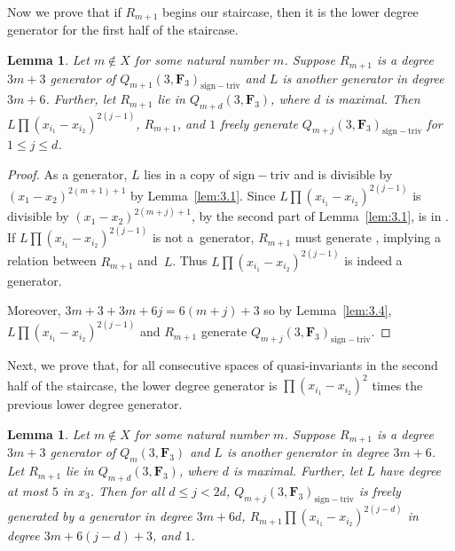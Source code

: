 \documentclass[pdftex]{sigma}
\newtheorem{Lemma}[Theorem]{Lemma}
\theoremstyle{definition}
\numberwithin{equation}{section}
\newcommand{\siv}{\mathrm{sign-triv}}
\begin{document}
Now we prove that if $R_{m+1}$ begins our staircase, then it is the lower degree generator for the first half of the staircase.

\begin{Lemma}\label{higerGen}
 Let $m\not\in X$ for some natural number $m$. Suppose $R_{m+1}$ is a degree $3m+3$ generator of $Q_{m+1}(3,\mathbf{F}_3)_{\siv}$ and $L$ is another generator in degree $3m+6$. Further, let $R_{m+1}$ lie in $Q_{m+d}(3,\mathbf{F}_3)$, where $d$ is maximal. Then $L\prod(x_{i_1}-x_{i_2})^{2(j-1)}$, $R_{m+1}$, and $1$ freely generate $Q_{m+j}(3,\mathbf{F}_3)_{\siv}$ for $1\leq j \leq d$.
\end{Lemma}
\begin{proof}
 As a generator, $L$ lies in a copy of $\siv$ and is divisible by $(x_1-x_2)^{2(m+1)+1}$ by Lemma~\ref{lem:3.1}. Since $L\prod(x_{i_1}-x_{i_2})^{2(j-1)}$ is divisible by $(x_1-x_2)^{2(m+j)+1}$, by the second part of Lemma~\ref{lem:3.1},  is in \smash{$Q_{m+j}(3,\mathbf{F}_3)_{\siv}$}. If $L\prod(x_{i_1}-x_{i_2})^{2(j-1)}$ is not a~generator, $R_{m+1}$ must generate , implying a relation between $R_{m+1}$ and~$L$. Thus $L\prod(x_{i_1}-x_{i_2})^{2(j-1)}$ is indeed a generator.

 Moreover, $3m+3+3m+6j=6(m+j)+3$ so by Lemma~\ref{lem:3.4}, $L\prod(x_{i_1}-x_{i_2})^{2(j-1)}$ and $R_{m+1}$ generate $Q_{m+j}(3,\mathbf{F}_3)_{\siv}$.
\end{proof}

Next, we prove that, for all consecutive spaces of quasi-invariants in the second half of the staircase, the lower degree generator is $\prod (x_{i_1}-x_{i_2})^{2}$ times the previous lower degree generator.

\begin{Lemma}\label{lowerGen}
 Let $m\not\in X$ for some natural number $m$. Suppose $R_{m+1}$ is a degree $3m+3$ generator of $Q_m(3,\mathbf{F}_3)$ and $L$ is another generator in degree $3m+6$. Let $R_{m+1}$ lie in $Q_{m+d}(3,\mathbf{F}_3)$, where $d$ is maximal. Further, let $L$ have degree at most $5$ in $x_3$. Then for all $d\leq j< 2d$, $Q_{m+j}(3,\mathbf{F}_3)_{\siv}$ is freely generated by a generator in degree $3m+6d$, $R_{m+1}\prod(x_{i_1}-x_{i_2})^{2(j-d)}$ in degree $3m+6(j-d)+3$, and $1$.
\end{Lemma}
\end{document}
